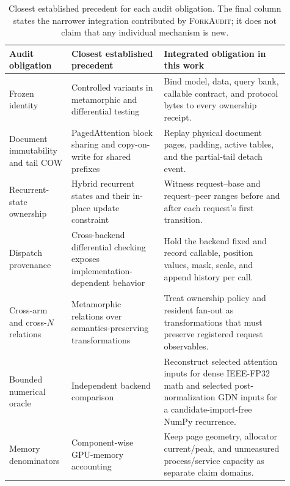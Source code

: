 \documentclass{article}
\newcommand{\method}{\textsc{ForkAudit}}
\begin{document}
\begin{table}[H]
\caption{Closest established precedent for each audit obligation.  The final
column states the narrower integration contributed by \method{}; it does not
claim that any individual mechanism is new.}
\centering\scriptsize
\begin{tabular}{@{}p{0.18\linewidth}p{0.31\linewidth}p{0.42\linewidth}@{}}
\toprule
Audit obligation & Closest established precedent & Integrated obligation in this work \\
\midrule
Frozen identity & Controlled variants in metamorphic and differential testing~\citep{chen2018metamorphic,xiao2022metamorphic,pham2019cradle} & Bind model, data, query bank, callable contract, and protocol bytes to every ownership receipt. \\
Document immutability and tail COW & PagedAttention block sharing and copy-on-write for shared prefixes~\citep{kwon2023pagedattention} & Replay physical document pages, padding, active tables, and the partial-tail detach event. \\
Recurrent-state ownership & Hybrid recurrent states and their in-place update constraint~\citep{yang2025gateddeltanet,pan2025marconi} & Witness request--base and request--peer ranges before and after each request's first transition. \\
Dispatch provenance & Cross-backend differential checking exposes implementation-dependent behavior~\citep{pham2019cradle} & Hold the backend fixed and record callable, position values, mask, scale, and append history per call. \\
Cross-arm and cross-$N$ relations & Metamorphic relations over semantics-preserving transformations~\citep{chen2018metamorphic,xiao2022metamorphic} & Treat ownership policy and resident fan-out as transformations that must preserve registered request observables. \\
Bounded numerical oracle & Independent backend comparison~\citep{pham2019cradle} & Reconstruct selected attention inputs for dense IEEE-FP32 math and selected post-normalization GDN inputs for a candidate-import-free NumPy recurrence. \\
Memory denominators & Component-wise GPU-memory accounting~\citep{gao2020dnnmem} & Keep page geometry, allocator current/peak, and unmeasured process/service capacity as separate claim domains. \\
\bottomrule
\end{tabular}
\end{table}
\end{document}
